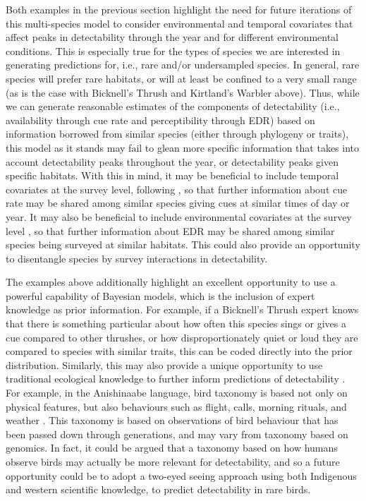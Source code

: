 \documentclass[12pt]{article}
\begin{document}
Both examples in the previous section highlight the need for future iterations of this multi-species model to consider environmental and temporal covariates that affect peaks in detectability through the year and for different environmental conditions. 
This is especially true for the types of species we are interested in generating predictions for, i.e., rare and/or undersampled species.
In general, rare species will prefer rare habitats, or will at least be confined to a very small range (as is the case with Bicknell’s Thrush and Kirtland’s Warbler above). 
Thus, while we can generate reasonable estimates of the components of detectability (i.e., availability through cue rate and perceptibility through EDR) based on information borrowed from similar species (either through phylogeny or traits), this model as it stands may fail to glean more specific information that takes into account detectability peaks throughout the year, or detectability peaks given specific habitats. 
With this in mind, it may be beneficial to include temporal covariates at the survey level, following \citet{solymos_calibrating_2013, solymos_evaluating_2018, edwards_point_2023}, so that further information about cue rate may be shared among similar species giving cues at similar times of day or year.
It may also be beneficial to include environmental covariates at the survey level \citep{solymos_calibrating_2013, edwards_point_2023}, so that further information about EDR may be shared among similar species being surveyed at similar habitats.
This could also provide an opportunity to disentangle species by survey interactions in detectability.

\par The examples above additionally highlight an excellent opportunity to use a powerful capability of Bayesian models, which is the inclusion of expert knowledge as prior information. 
For example, if a Bicknell’s Thrush expert knows that there is something particular about how often this species sings or gives a cue compared to other thrushes, or how disproportionately quiet or loud they are compared to species with similar traits, this can be coded directly into the prior distribution.
Similarly, this may also provide a unique opportunity to use traditional ecological knowledge to further inform predictions of detectability \citep{wardfear_sharper_2019}.
For example, in the Anishinaabe language, bird taxonomy is based not only on physical features, but also behaviours such as flight, calls, morning rituals, and weather \citep{pitawanakwat_evening_2022}.
This taxonomy is based on observations of bird behaviour that has been passed down through generations, and may vary from taxonomy based on genomics.
In fact, it could be argued that a taxonomy based on how humans observe birds may actually be more relevant for detectability, and so a future opportunity could be to adopt a two-eyed seeing approach \cite{reid_twoeyed_2021} using both Indigenous and western scientific knowledge, to predict detectability in rare birds.
\end{document}
